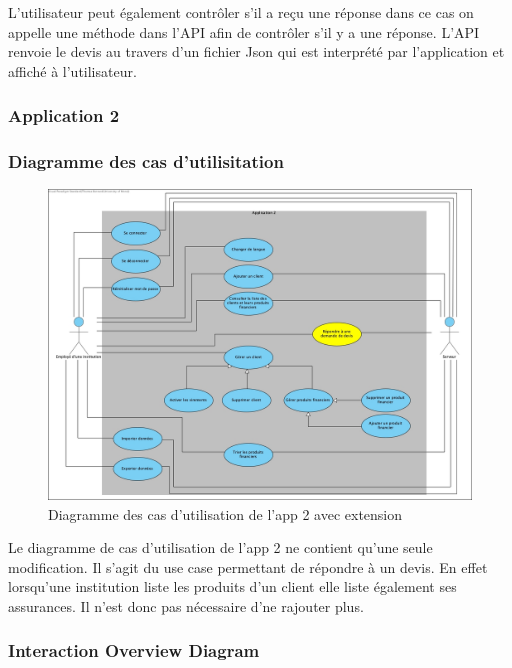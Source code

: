 \documentclass[../rapport.tex]{subfiles}
\begin{document}
						L'utilisateur peut également contrôler s'il a reçu une réponse dans ce cas on appelle une méthode dans l'API afin de contrôler s'il y a une réponse.
						L'API renvoie le devis au travers d'un fichier Json qui est interprété par l'application et affiché à l'utilisateur.
\newpage

		\subsubsection{Application 2}

		\subsubsection{Diagramme des cas d'utilisitation}

				\begin{figure}[h]
						\center\includegraphics[scale=0.27]{ressources/photos_diagrammes/extensionThomas/useCase2Thomas.jpg}
						\caption{Diagramme des cas d'utilisation de l'app 2 avec extension}
				\end{figure}

				Le diagramme de cas d'utilisation de l'app 2 ne contient qu'une seule modification.
				Il s'agit du use case permettant de répondre à un devis. En effet lorsqu'une
				institution liste les produits d'un client elle liste également ses assurances.
				Il n'est donc pas nécessaire d'ne rajouter plus.

		\subsubsection{Interaction Overview Diagram}
\end{document}
